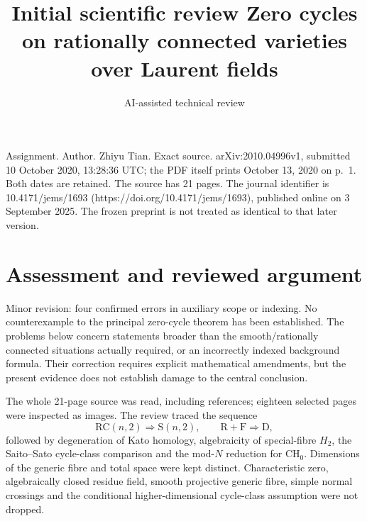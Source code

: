 \documentclass[10pt]{article}
\title{Initial scientific review
Zero cycles on rationally connected varieties
over Laurent fields}
\author{AI-assisted technical review}
\date{}
\begin{document}
\maketitle
Assignment. Author. Zhiyu Tian. Exact source. arXiv:2010.04996v1, submitted 10 October 2020, 13:28:36 UTC; the PDF itself prints October 13, 2020 on p. 1. Both dates are retained. The source has 21 pages. The journal identifier is 10.4171/jems/1693 (https://doi.org/10.4171/jems/1693), published online on 3 September 2025. The frozen preprint is not treated as identical to that later version.\par
\section*{Assessment and reviewed argument}
Minor revision: four confirmed errors in auxiliary scope or indexing. No counterexample to the principal zero-cycle theorem has been established. The problems below concern statements broader than the smooth/rationally connected situations actually required, or an incorrectly indexed background formula. Their correction requires explicit mathematical amendments, but the present evidence does not establish damage to the central conclusion.\par
The whole 21-page source was read, including references; eighteen selected pages were inspected as images. The review traced the sequence \[\mathrm{RC}(n,2)\Longrightarrow \mathrm{S}(n,2),\qquad
 \mathrm{R}+\mathrm{F}\Longrightarrow\mathrm{D},\] followed by degeneration of Kato homology, algebraicity of special-fibre \(H_2\), the Saito–Sato cycle-class comparison and the mod-\(N\) reduction for \(\mathrm{CH}_0\). Dimensions of the generic fibre and total space were kept distinct. Characteristic zero, algebraically closed residue field, smooth projective generic fibre, simple normal crossings and the conditional higher-dimensional cycle-class assumption were not dropped.\par
\end{document}
